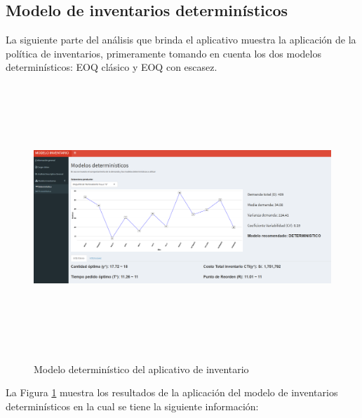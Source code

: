 \subsection{Modelo de inventarios determinísticos}

La siguiente parte del análisis que brinda el aplicativo muestra la aplicación de la política de inventarios, primeramente tomando en cuenta los dos modelos determinísticos: EOQ clásico y EOQ con escasez.

\begin{figure}[H]
  \caption{Modelo determinístico del aplicativo de inventario}
  {\includegraphics[width=16cm, height=10cm]{images/Shiny6.png}}
  \label{fig:Shiny6}
\end{figure}

La Figura \ref{fig:Shiny6} muestra los resultados de la aplicación del modelo de inventarios determinísticos en la cual se tiene la siguiente información:


